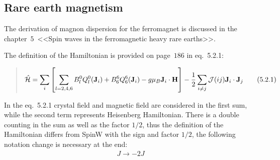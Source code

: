 \subsection{Rare earth magnetism \cite{jensen1991rare}}
    The derivation of magnon dispersion for the ferromagnet is discussed in the chapter~$5$~<<Spin waves in the ferromagnetic heavy rare earths>>.

    The definition of the Hamiltonian is provided on page~$186$ in eq.~5.2.1:

    \begin{quote}
        \begin{equation}
            \hat{\mathcal{H}} = \sum_i\left[\sum_{l = 2,4,6}B^0_lQ_l^0(\mathbf{J}_i) + B^6_6Q_6^6(\mathbf{J}_i) - g\mu_B \mathbf{J}_i\cdot\mathbf{H}\right]
            - \dfrac{1}{2} \sum_{i\ne j} \mathcal{J}(ij)\mathbf{J} _i\cdot\mathbf{J}_j\label{eq:rem-5.2.1} \tag{5.2.1}
        \end{equation}
    \end{quote}
    
    In the eq.~5.2.1 crystal field and magnetic field are considered in the first sum, while the second term represents Heisenberg Hamiltonian.
    There is a double counting in the sum as well as the factor $1/2$, thus the definition of the Hamiltonian differs from SpinW with the sign and factor $1/2$, the following notation change is necessary at the end:
    \begin{equation}
        \begin{matrix} 
            J \rightarrow -2J
        \end{matrix}
    \end{equation}

